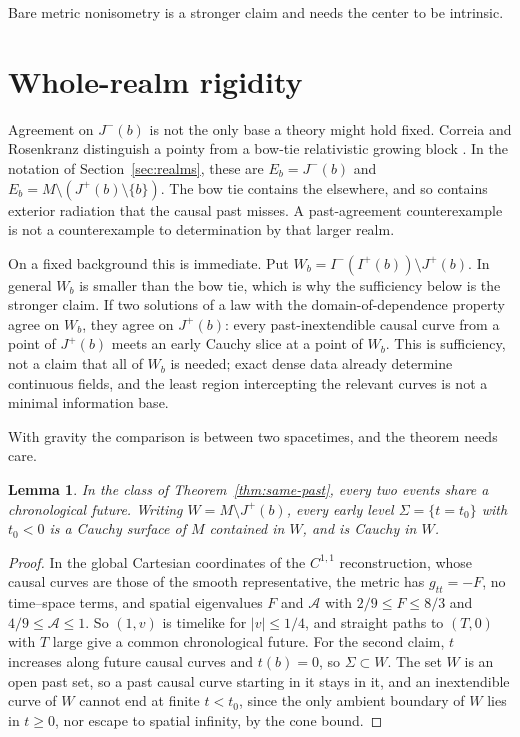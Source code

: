 \documentclass[11pt]{article}
\newtheorem{lemma}[theorem]{Lemma}
\theoremstyle{definition}
\newcommand{\Ifut}{I^{+}}
\newcommand{\Ichr}{I^{-}}
\newcommand{\Jp}{J^{+}}
\newcommand{\Jm}{J^{-}}
\begin{document}
Bare metric nonisometry is a stronger claim and needs the center to be intrinsic.

\section{Whole-realm rigidity}\label{sec:rigidity}

Agreement on $\Jm(b)$ is not the only base a theory might hold fixed. Correia and Rosenkranz
distinguish a pointy from a bow-tie relativistic growing block \citep[Chap.~9]{CR2018}. In the notation of Section~\ref{sec:realms}, these are $E_b=\Jm(b)$ and $E_b=M\setminus(\Jp(b)\setminus\{b\})$.
The bow tie contains the elsewhere, and so contains exterior radiation that the causal past misses.
A past-agreement counterexample is not a counterexample to determination by that larger realm.

On a fixed background this is immediate. Put $W_b=\Ichr(\Ifut(b))\setminus\Jp(b)$. In general $W_b$ is smaller than the bow tie, which is why the sufficiency below is the stronger claim. If two solutions of a
law with the domain-of-dependence property agree on $W_b$, they agree on $\Jp(b)$: every past-inextendible
causal curve from a point of $\Jp(b)$ meets an early Cauchy slice at a point of $W_b$. This is
sufficiency, not a claim that all of $W_b$ is needed; exact dense data already determine continuous
fields, and the least region intercepting the relevant curves is not a minimal information base.

With gravity the comparison is between two spacetimes, and the theorem needs care.

\begin{lemma}\label{lem:cones}
In the class of Theorem~\ref{thm:same-past}, every two events share a chronological future. Writing
$W=M\setminus\Jp(b)$, every early level $\Sigma=\{t=t_0\}$ with $t_0<0$ is a Cauchy surface of $M$
contained in $W$, and is Cauchy in $W$.
\end{lemma}

\begin{proof}
In the global Cartesian coordinates of the $C^{1,1}$ reconstruction, whose causal curves are those of the smooth representative, the metric has $g_{tt}=-F$, no time--space terms, and spatial
eigenvalues $F$ and $\mathcal A$ with $2/9\le F\le8/3$ and $4/9\le\mathcal A\le1$. So $(1,v)$ is timelike for
$|v|\le1/4$, and straight paths to $(T,0)$ with $T$ large give a common chronological future. For the
second claim, $t$ increases along future causal curves and $t(b)=0$, so $\Sigma\subset W$. The set $W$ is an
open past set, so a past causal curve starting in it stays in it, and an inextendible curve of $W$
cannot end at finite $t<t_0$, since the only ambient boundary of $W$ lies in $t\ge0$, nor escape to spatial infinity, by the cone bound.
\end{proof}
\end{document}
